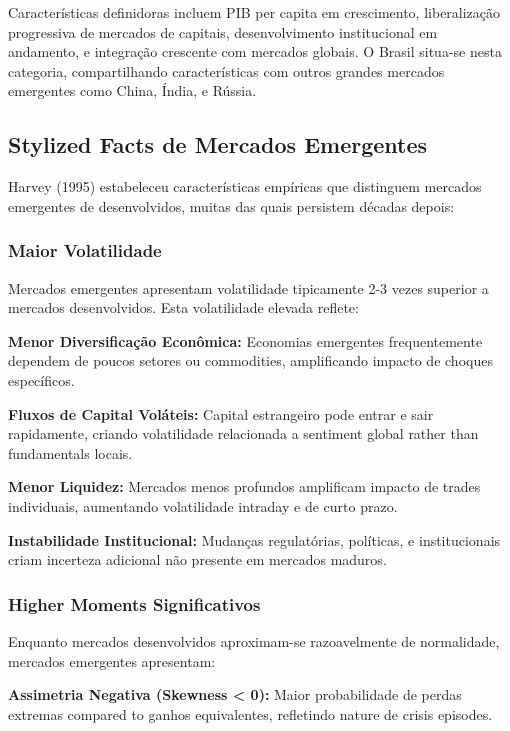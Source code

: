 Características definidoras incluem PIB per capita em crescimento, liberalização progressiva de mercados de capitais, desenvolvimento institucional em andamento, e integração crescente com mercados globais. O Brasil situa-se nesta categoria, compartilhando características com outros grandes mercados emergentes como China, Índia, e Rússia.

\subsection{Stylized Facts de Mercados Emergentes}

Harvey (1995) estabeleceu características empíricas que distinguem mercados emergentes de desenvolvidos, muitas das quais persistem décadas depois:

\subsubsection{Maior Volatilidade}

Mercados emergentes apresentam volatilidade tipicamente 2-3 vezes superior a mercados desenvolvidos. Esta volatilidade elevada reflete:

\textbf{Menor Diversificação Econômica:} Economias emergentes frequentemente dependem de poucos setores ou commodities, amplificando impacto de choques específicos.

\textbf{Fluxos de Capital Voláteis:} Capital estrangeiro pode entrar e sair rapidamente, criando volatilidade relacionada a sentiment global rather than fundamentals locais.

\textbf{Menor Liquidez:} Mercados menos profundos amplificam impacto de trades individuais, aumentando volatilidade intraday e de curto prazo.

\textbf{Instabilidade Institucional:} Mudanças regulatórias, políticas, e institucionais criam incerteza adicional não presente em mercados maduros.

\subsubsection{Higher Moments Significativos}

Enquanto mercados desenvolvidos aproximam-se razoavelmente de normalidade, mercados emergentes apresentam:

\textbf{Assimetria Negativa (Skewness < 0):} Maior probabilidade de perdas extremas compared to ganhos equivalentes, refletindo nature de crisis episodes.

